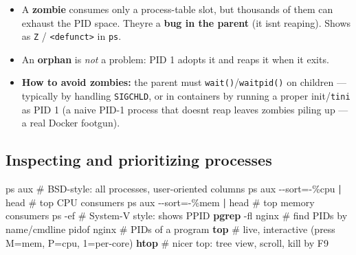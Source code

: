 \documentclass[11pt]{article}
\providecommand{\tightlist}{\setlength{\itemsep}{1pt}\setlength{\parskip}{0pt}}
\newenvironment{Shaded}{\begin{snugshade}}{\end{snugshade}}
\newcommand{\AttributeTok}[1]{\textcolor[rgb]{0.16,0.50,0.73}{#1}}
\newcommand{\CommentTok}[1]{\textcolor[rgb]{0.48,0.49,0.49}{#1}}
\newcommand{\ExtensionTok}[1]{\textcolor[rgb]{0.00,0.60,1.00}{\textbf{#1}}}
\newcommand{\FunctionTok}[1]{\textcolor[rgb]{0.56,0.27,0.68}{#1}}
\newcommand{\KeywordTok}[1]{\textcolor[rgb]{0.81,0.81,0.76}{\textbf{#1}}}
\newcommand{\NormalTok}[1]{\textcolor[rgb]{0.81,0.81,0.76}{#1}}
\newcommand{\OperatorTok}[1]{\textcolor[rgb]{0.81,0.81,0.76}{#1}}
\newcommand{\StringTok}[1]{\textcolor[rgb]{0.96,0.31,0.31}{#1}}
\begin{document}
\begin{itemize}
\tightlist
\item
  A \textbf{zombie} consumes only a process-table slot, but thousands of them can exhaust the PID space. They\textquotesingle re a \textbf{bug in the parent} (it isn\textquotesingle t reaping). Shows as \texttt{Z} / \texttt{\textless{}defunct\textgreater{}} in \texttt{ps}.
\item
  An \textbf{orphan} is \emph{not} a problem: PID 1 adopts it and reaps it when it exits.
\item
  \textbf{How to avoid zombies:} the parent must \texttt{wait()}/\texttt{waitpid()} on children --- typically by handling \texttt{SIGCHLD}, or in containers by running a proper init/\texttt{tini} as PID 1 (a naive PID-1 process that doesn\textquotesingle t reap leaves zombies piling up --- a real Docker footgun).
\end{itemize}


\begin{Shaded}
\end{Shaded}

\subsection{Inspecting and prioritizing processes}\label{inspecting-and-prioritizing-processes}


\begin{Shaded}
\begin{Highlighting}[]
\FunctionTok{ps}\NormalTok{ aux                         }\CommentTok{\# BSD{-}style: all processes, user{-}oriented columns}
\FunctionTok{ps}\NormalTok{ aux }\AttributeTok{{-}{-}sort}\OperatorTok{=}\NormalTok{{-}\%cpu }\KeywordTok{|} \FunctionTok{head}     \CommentTok{\# top CPU consumers}
\FunctionTok{ps}\NormalTok{ aux }\AttributeTok{{-}{-}sort}\OperatorTok{=}\NormalTok{{-}\%mem }\KeywordTok{|} \FunctionTok{head}     \CommentTok{\# top memory consumers}
\FunctionTok{ps} \AttributeTok{{-}ef}                         \CommentTok{\# System{-}V style: shows PPID}
\ExtensionTok{pgrep} \AttributeTok{{-}fl}\NormalTok{ nginx                }\CommentTok{\# find PIDs by name/cmdline}
\FunctionTok{pidof}\NormalTok{ nginx                    }\CommentTok{\# PIDs of a program}
\ExtensionTok{top}                            \CommentTok{\# live, interactive (press M=mem, P=cpu, 1=per{-}core)}
\ExtensionTok{htop}                           \CommentTok{\# nicer top: tree view, scroll, kill by F9}
\end{Highlighting}
\end{Shaded}
\end{document}
